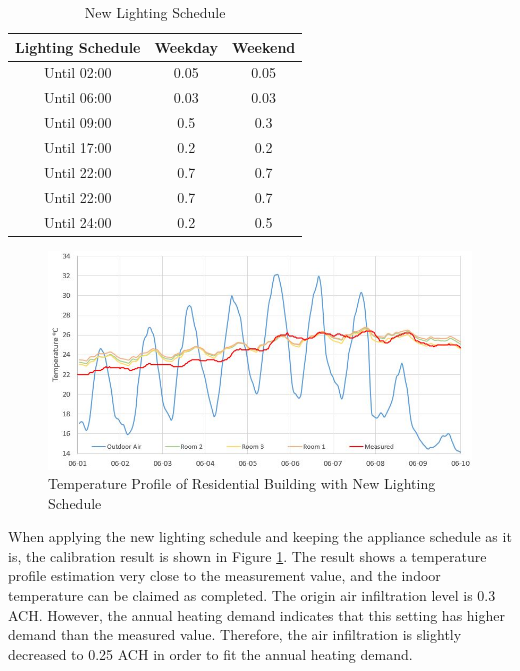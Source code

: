 \documentclass[a4paper, oneside]{discothesis}
\begin{document}
        	\begin{table}[htbp]
        	\centering
        	\caption{New Lighting Schedule}
        	    \begin{tabular}{ccc}
        	    \toprule
        	    Lighting Schedule & Weekday & Weekend\\
        	    \midrule
                Until 02:00 & 0.05 & 0.05 \\
                Until 06:00 & 0.03 & 0.03\\
                Until 09:00 & 0.5 & 0.3\\
                Until 17:00 & 0.2 & 0.2\\
                Until 22:00 & 0.7 & 0.7\\
                Until 22:00 & 0.7 & 0.7\\
                Until 24:00 & 0.2 & 0.5\\
        	    \bottomrule
        	    \end{tabular}%
        	  \label{tab:HonggLightingCtrl}%
        	\end{table}%
			
			
			\begin{figure}[H]
			\centering
			\includegraphics[scale=0.7]{Hongg_Clibration_03NewLight.JPG}
			\caption{Temperature Profile of Residential Building with New Lighting Schedule}
			\label{fig:HonggerCalibrationNewLight}
			\end{figure}
			
			When applying the new lighting schedule and keeping the appliance schedule as it is, the calibration result is shown in Figure \ref{fig:HonggerCalibrationNewLight}. The result shows a temperature profile estimation very close to the measurement value, and the indoor temperature can be claimed as completed.
			The origin air infiltration level is 0.3 ACH. However, the annual heating demand indicates that this setting has higher demand than the measured value. Therefore, the air infiltration is slightly decreased to 0.25 ACH in order to fit the annual heating demand.\\ 
\end{document}
